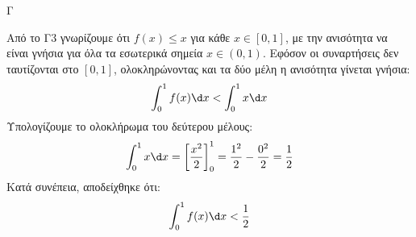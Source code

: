 \begin{thema}{Γ}
\begin{erwthma}
\item Από το Γ3 γνωρίζουμε ότι $f(x) \le x$ για κάθε $x \in [0, 1]$, με την ανισότητα να είναι γνήσια για όλα τα εσωτερικά σημεία $x \in (0,1)$. Εφόσον οι συναρτήσεις δεν ταυτίζονται στο $[0,1]$, ολοκληρώνοντας και τα δύο μέλη η ανισότητα γίνεται γνήσια:
\[ \int_0^1 f(x) \d x < \int_0^1 x \d x \]
Υπολογίζουμε το ολοκλήρωμα του δεύτερου μέλους:
\[ \int_0^1 x \d x = \left[ \frac{x^2}{2} \right]_0^1 = \frac{1^2}{2} - \frac{0^2}{2} = \frac{1}{2} \]
Κατά συνέπεια, αποδείχθηκε ότι:
\[ \int_0^1 f(x) \d x < \frac{1}{2} \]
\end{erwthma}
\end{thema}

